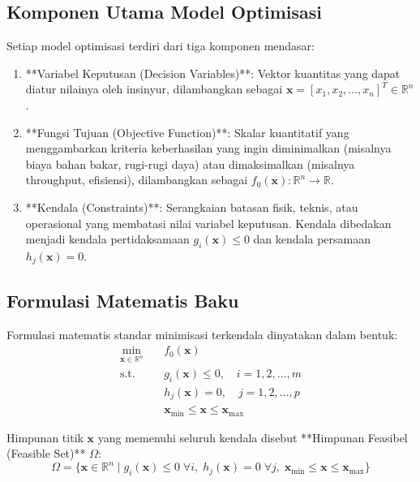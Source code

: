 \documentclass[11pt,a4paper]{article}
\newcommand{\R}{\mathbb{R}}
\begin{document}
\subsection{Komponen Utama Model Optimisasi}
Setiap model optimisasi terdiri dari tiga komponen mendasar:
\begin{enumerate}
    \item **Variabel Keputusan (Decision Variables)**: Vektor kuantitas yang dapat diatur nilainya oleh insinyur, dilambangkan sebagai $\mathbf{x} = [x_1, x_2, \dots, x_n]^T \in \R^n$.
    \item **Fungsi Tujuan (Objective Function)**: Skalar kuantitatif yang menggambarkan kriteria keberhasilan yang ingin diminimalkan (misalnya biaya bahan bakar, rugi-rugi daya) atau dimaksimalkan (misalnya throughput, efisiensi), dilambangkan sebagai $f_0(\mathbf{x}): \R^n \to \R$.
    \item **Kendala (Constraints)**: Serangkaian batasan fisik, teknis, atau operasional yang membatasi nilai variabel keputusan. Kendala dibedakan menjadi kendala pertidaksamaan $g_i(\mathbf{x}) \le 0$ dan kendala persamaan $h_j(\mathbf{x}) = 0$.
\end{enumerate}

\subsection{Formulasi Matematis Baku}
Formulasi matematis standar minimisasi terkendala dinyatakan dalam bentuk:
\begin{equation}
    \begin{aligned}
        \min_{\mathbf{x} \in \R^n} \quad & f_0(\mathbf{x}) \\
        \text{s.t.} \quad & g_i(\mathbf{x}) \le 0, \quad i = 1, 2, \dots, m \\
        & h_j(\mathbf{x}) = 0, \quad j = 1, 2, \dots, p \\
        & \mathbf{x}_{\min} \le \mathbf{x} \le \mathbf{x}_{\max}
    \end{aligned}
\end{equation}

Himpunan titik $\mathbf{x}$ yang memenuhi seluruh kendala disebut **Himpunan Feasibel (Feasible Set)** $\Omega$:
\begin{equation}
    \Omega = \{ \mathbf{x} \in \R^n \mid g_i(\mathbf{x}) \le 0 \; \forall i, \; h_j(\mathbf{x}) = 0 \; \forall j, \; \mathbf{x}_{\min} \le \mathbf{x} \le \mathbf{x}_{\max} \}
\end{equation}
\end{document}

